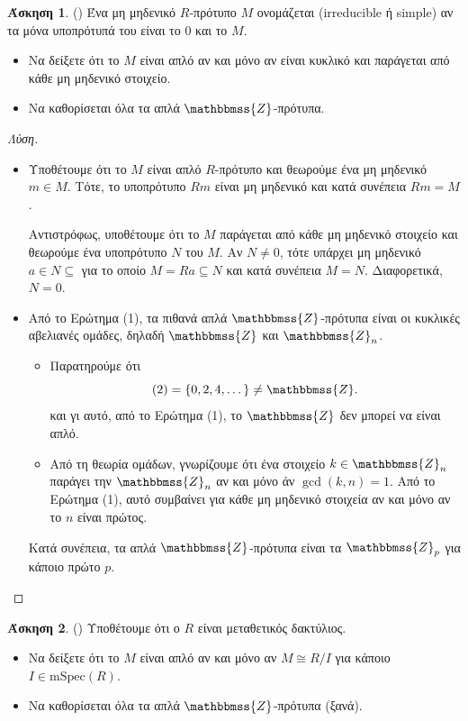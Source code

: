 \documentclass[12pt,a4paper,reqno]{amsart}
\theoremstyle{definition}
\newtheorem{exercise}{Άσκηση}
\newcommand{\ZZ}{\mathbbmss{Z}}
\newcommand{\mSpec}{\mathrm{mSpec}}
\newcommand{\defn}[1]{{\color{mylightblue}{#1}}}
\begin{document}
\begin{exercise}{\rm(\cite[Άσκηση~10.3.9]{DF04})}
  \label{ex:DF_10.3.9}
  Ένα μη μηδενικό $R$-πρότυπο $M$ ονομάζεται \defn{απλό} (irreducible ή simple) αν τα μόνα υποπρότυπά του είναι το $0$ και το $M$.
  \begin{itemize}
    \item[(1)] Να δείξετε ότι το $M$ είναι απλό αν και μόνο αν είναι κυκλικό και παράγεται από κάθε μη μηδενικό στοιχείο.
    \item[(2)] Να καθορίσεται όλα τα απλά $\ZZ$-πρότυπα.
  \end{itemize}
\end{exercise}

\begin{proof}[Λύση]
  \leavevmode
  \begin{itemize}
    \item[(1)] Υποθέτουμε ότι το $M$ είναι απλό $R$-πρότυπο και θεωρούμε ένα μη μηδενικό $m \in M$. Τότε, το υποπρότυπο $Rm$ είναι μη μηδενικό και κατά συνέπεια $Rm = M$.
    
    Αντιστρόφως, υποθέτουμε ότι το $M$ παράγεται από κάθε μη μηδενικό στοιχείο και θεωρούμε ένα υποπρότυπο $N$ του $M$. Αν $N \neq 0$, τότε υπάρχει μη μηδενικό $a \in N \subseteq$ για το οποίο $M = Ra \subseteq N$ και κατά συνέπεια $M = N$. Διαφορετικά, $N=0$.
    \item[(2)] Από το Ερώτημα (1), τα πιθανά απλά $\ZZ$-πρότυπα είναι οι κυκλικές αβελιανές ομάδες, δηλαδή $\ZZ$ και $\ZZ_n$. 
    \begin{itemize}
      \item Παρατηρούμε ότι 
      \[
      (2) = \{0, 2, 4, \dots\} \neq \ZZ.
      \]
      και γι αυτό, από το Ερώτημα (1), το $\ZZ$ δεν μπορεί να είναι απλό.
      \item Από τη θεωρία ομάδων, γνωρίζουμε ότι ένα στοιχείο $k \in \ZZ_n$ παράγει την $\ZZ_n$ αν και μόνο άν $\gcd(k,n) = 1$. Από το Ερώτημα (1), αυτό συμβαίνει για κάθε μη μηδενικό στοιχεία αν και μόνο αν το $n$ είναι πρώτος.
    \end{itemize}
    Κατά συνέπεια, τα απλά $\ZZ$-πρότυπα είναι τα $\ZZ_p$ για κάποιο πρώτο $p$.
  \end{itemize}
\end{proof}

\begin{exercise}{\rm(\cite[Άσκηση~10.3.10]{DF04})}
  \label{ex:DF_10.3.10}
  Υποθέτουμε ότι ο $R$ είναι μεταθετικός δακτύλιος.
  \begin{itemize}
    \item[(1)] Να δείξετε ότι το $M$ είναι απλό αν και μόνο αν $M \cong R/I$ για κάποιο $I \in \mSpec(R)$.
    \item[(2)] Να καθορίσεται όλα τα απλά $\ZZ$-πρότυπα (ξανά).
  \end{itemize}
\end{exercise}
\end{document}
